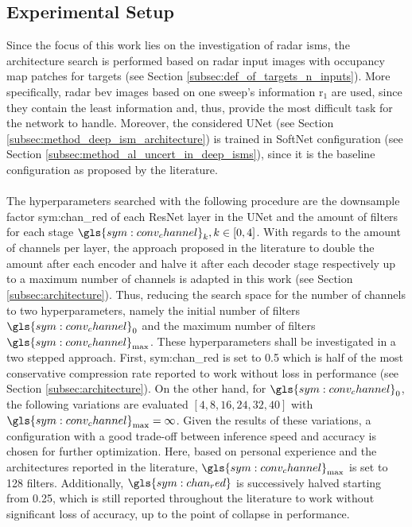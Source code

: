 \subsection{Experimental Setup}
\label{subsec:exp_setup_unet_arch}
Since the focus of this work lies on the investigation of radar \gls{ism}s, the architecture search is performed based on radar input images with occupancy map patches for targets (see Section \ref{subsec:def_of_targets_n_inputs}). More specifically, radar \gls{bev} images based on one sweep's information \gls{r}$_{1}$ are used, since they contain the least information and, thus, provide the most difficult task for the network to handle. Moreover, the considered UNet (see Section \ref{subsec:method_deep_ism_architecture}) is trained in SoftNet configuration (see Section \ref{subsec:method_al_uncert_in_deep_isms}), since it is the baseline configuration as proposed by the literature.
\\\\
The hyperparameters searched with the following procedure are the downsample factor \gls{sym:chan_red} of each ResNet layer in the UNet and the amount of filters for each stage $\gls{sym:conv_channel}_k, k \in [0,4]$. With regards to the amount of channels per layer, the approach proposed in the literature to double the amount after each encoder and halve it after each decoder stage respectively up to a maximum number of channels is adapted in this work (see Section \ref{subsec:architecture}). Thus, reducing the search space for the number of channels to two hyperparameters, namely the initial number of filters $\gls{sym:conv_channel}_0$ and the maximum number of filters $\gls{sym:conv_channel}_{\max}$. These hyperparameters shall be investigated in a two stepped approach. First, \gls{sym:chan_red} is set to 0.5 which is half of the most conservative compression rate reported to work without loss in performance (see Section \ref{subsec:architecture}). On the other hand, for $\gls{sym:conv_channel}_0$, the following variations are evaluated $[4,8,16,24,32,40]$ with $\gls{sym:conv_channel}_{\max} = \infty$. Given the results of these variations, a configuration with a good trade-off between inference speed and accuracy is chosen for further optimization. Here, based on personal experience and the architectures reported in the literature, $\gls{sym:conv_channel}_{\max}$ is set to 128 filters. Additionally, $\gls{sym:chan_red}$ is successively halved starting from 0.25, which is still reported throughout the literature to work without significant loss of accuracy, up to the point of collapse in performance.
